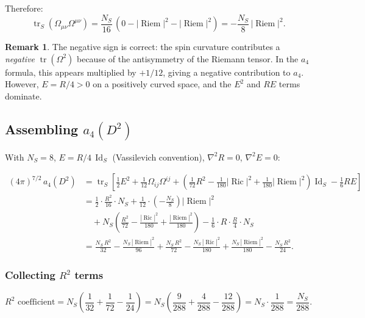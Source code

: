 \documentclass[12pt,a4paper]{article}
\theoremstyle{definition}
\newtheorem{remark}{Remark}
\DeclareMathOperator{\tr}{tr}
\DeclareMathOperator{\Ric}{Ric}
\DeclareMathOperator{\Riem}{Riem}
\DeclareMathOperator{\Id}{Id}
\begin{document}
Therefore:
\begin{equation}\label{eq:trOmOm}
\boxed{\tr_S(\Omega_{\mu\nu}\Omega^{\mu\nu})
= \frac{N_S}{16}\,(0 - |\Riem|^2 - |\Riem|^2)
= -\frac{N_S}{8}\,|\Riem|^2.}
\end{equation}

\begin{remark}
The negative sign is correct: the spin curvature contributes a
\emph{negative} $\tr(\Omega^2)$ because of the antisymmetry of the
Riemann tensor.  In the $a_4$ formula, this appears multiplied by
$+1/12$, giving a negative contribution to $a_4$.  However, $E =
R/4 > 0$ on a positively curved space, and the $E^2$ and $RE$ terms
dominate.
\end{remark}


\subsection{Assembling $a_4(D^2)$}
\label{sec:assembly}

With $N_S = 8$, $E = R/4\,\Id_S$ (Vassilevich convention),
$\nabla^2 R = 0$, $\nabla^2 E = 0$:

\begin{align}
(4\pi)^{7/2}\,a_4(D^2)
  &= \tr_S\!\left[\frac{1}{2}E^2 + \frac{1}{12}\Omega_{ij}\Omega^{ij}
  + \left(\frac{1}{72}R^2 - \frac{1}{180}|\Ric|^2
  + \frac{1}{180}|\Riem|^2\right)\Id_S
  - \frac{1}{6}RE\right] \nonumber\\[8pt]
%
  &= \frac{1}{2}\cdot\frac{R^2}{16}\cdot N_S
  + \frac{1}{12}\cdot\left(-\frac{N_S}{8}\right)|\Riem|^2 \nonumber\\
  &\quad + N_S\left(\frac{R^2}{72} - \frac{|\Ric|^2}{180}
  + \frac{|\Riem|^2}{180}\right)
  - \frac{1}{6}\cdot R\cdot\frac{R}{4}\cdot N_S \nonumber\\[8pt]
%
  &= \frac{N_S\,R^2}{32}
  - \frac{N_S\,|\Riem|^2}{96}
  + \frac{N_S\,R^2}{72}
  - \frac{N_S\,|\Ric|^2}{180}
  + \frac{N_S\,|\Riem|^2}{180}
  - \frac{N_S\,R^2}{24}.
  \label{eq:a4-D2-terms}
\end{align}

\subsubsection{Collecting $R^2$ terms}

\begin{equation}
R^2\text{ coefficient} = N_S\left(\frac{1}{32} + \frac{1}{72}
- \frac{1}{24}\right)
= N_S\left(\frac{9}{288} + \frac{4}{288} - \frac{12}{288}\right)
= N_S \cdot \frac{1}{288}
= \frac{N_S}{288}.
\end{equation}
\end{document}
